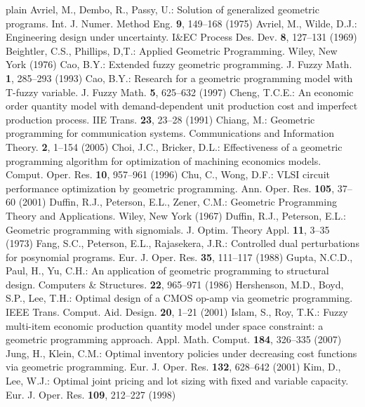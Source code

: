 \begin{thebibliography}{plain}
 Avriel, M., Dembo, R., Passy, U.: Solution of generalized geometric programs. Int. J. Numer. Method Eng. {\bf 9}, 149--168 (1975)
 Avriel, M., Wilde, D.J.: Engineering design under uncertainty. I\&EC Process Des. Dev. {\bf 8}, 127--131 (1969)
 Beightler, C.S., Phillips, D,T.: Applied Geometric Programming. Wiley, New York (1976)
 Cao, B.Y.: Extended fuzzy geometric programming. J. Fuzzy Math. {\bf 1}, 285--293 (1993)
 Cao, B.Y.: Research for a geometric programming model with T-fuzzy variable. J. Fuzzy Math. {\bf 5}, 625--632 (1997)
 Cheng, T.C.E.: An economic order quantity model with demand-dependent unit production cost and imperfect production process. IIE Trans. {\bf{23}}, 23--28 (1991)
 Chiang, M.: Geometric programming for communication systems. Communications and Information Theory. {\bf 2}, 1--154 (2005)
 Choi, J.C., Bricker, D.L.: Effectiveness of a geometric programming algorithm for optimization of machining economics models. Comput. Oper. Res. {\bf 10}, 957--961 (1996)
Chu, C., Wong, D.F.: VLSI circuit performance optimization by geometric programming. Ann. Oper. Res. {\bf 105}, 37--60 (2001)
 Duffin, R.J., Peterson, E.L., Zener, C.M.: Geometric Programming Theory and Applications. Wiley, New York (1967)
 Duffin, R.J., Peterson, E.L.: Geometric programming with signomials. J. Optim. Theory Appl. {\bf11}, 3--35 (1973)
 Fang, S.C., Peterson, E.L., Rajasekera, J.R.: Controlled dual perturbations for posynomial programs. Eur. J. Oper. Res. {\bf 35}, 111--117 (1988)
 Gupta, N.C.D., Paul, H., Yu, C.H.: An application of geometric programming to structural design. Computers \& Structures. {\bf 22}, 965--971 (1986)
 Hershenson, M.D., Boyd, S.P., Lee, T.H.: Optimal design of a CMOS op-amp via geometric programming. IEEE Trans. Comput. Aid. Design. {\bf 20}, 1--21 (2001) 
 Islam, S., Roy, T.K.: Fuzzy multi-item economic production quantity model under space constraint: a geometric programming approach. Appl. Math. Comput. {\bf 184}, 326--335 (2007)
 Jung, H., Klein, C.M.: Optimal inventory policies under decreasing cost functions via geometric programming. Eur. J. Oper. Res. {\bf 132}, 628--642 (2001) 
 Kim, D., Lee, W.J.: Optimal joint pricing and lot sizing with fixed and variable capacity. Eur. J. Oper. Res. {\bf 109}, 212--227 (1998)

\end{thebibliography}
